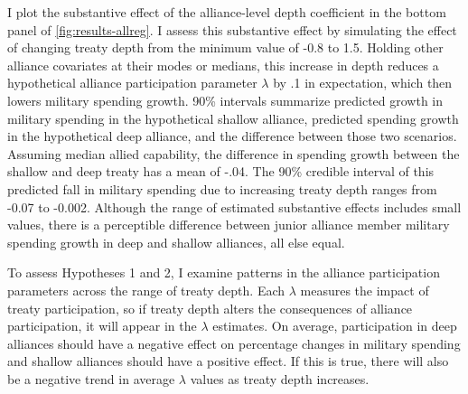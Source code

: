 \documentclass[12pt]{article}
\begin{document}
I plot the substantive effect of the alliance-level depth coefficient in the bottom panel of \autoref{fig:results-allreg}. 
I assess this substantive effect by simulating the effect of changing treaty depth from the minimum value of -0.8 to 1.5. 
Holding other alliance covariates at their modes or medians, this increase in depth reduces a hypothetical alliance participation parameter $\lambda$ by .1 in expectation, which then lowers military spending growth.
90\% intervals summarize predicted growth in military spending in the hypothetical shallow alliance, predicted spending growth in the hypothetical deep alliance, and the difference between those two scenarios.
Assuming median allied capability, the difference in spending growth between the shallow and deep treaty has a mean of -.04.
The 90\% credible interval of this predicted fall in military spending due to increasing treaty depth ranges from -0.07 to -0.002.
Although the range of estimated substantive effects includes small values, there is a perceptible difference between junior alliance member military spending growth in deep and shallow alliances, all else equal.  


To assess Hypotheses 1 and 2, I examine patterns in the alliance participation parameters across the range of treaty depth.
Each $\lambda$ measures the impact of treaty participation, so if treaty depth alters the consequences of alliance participation, it will appear in the $\lambda$ estimates. 
On average, participation in deep alliances should have a negative effect on percentage changes in military spending and shallow alliances should have a positive effect.
If this is true, there will also be a negative trend in average $\lambda$ values as treaty depth increases.
\end{document}
